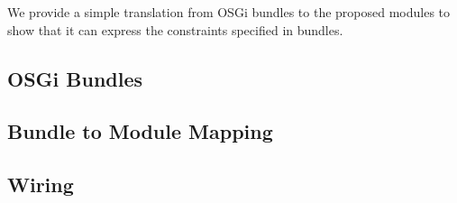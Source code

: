 We provide a simple translation from OSGi bundles to the proposed modules
to show that it can express the constraints specified in bundles.

\subsection{OSGi Bundles}


\subsection{Bundle to Module Mapping}

\subsection{Wiring}
